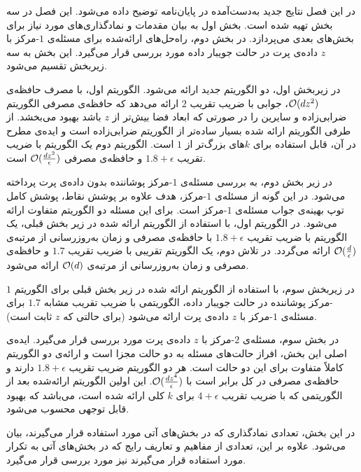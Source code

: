 

در این فصل نتایج جدید به‌دست‌آمده در پایان‌نامه توضیح داده می‌شود.
این فصل در سه بخش تهیه شده است. بخش اول به بیان مقدمات و نمادگذاری‌های مورد نیاز برای بخش‌های بعدی می‌پردازد.
در بخش دوم، راه‌حل‌های ارائه‌شده برای مسئله‌ی $1$-مرکز با $z$ داده‌ی پرت در حالت جویبار داده مورد بررسی قرار می‌گیرد. این بخش به سه زیربخش تقسیم می‌شود. 

در زیربخش اول، دو الگوریتم جدید ارائه می‌شود. الگوریتم اول، با مصرف حافظه‌ی $\mathcal{O}(dz^2)$، جوابی با ضریب تقریب $2$ ارائه می‌دهد که حافظه‌ی مصرفی الگوریتم ضرابی‌زاده و سایرین  را در صورتی که ابعاد فضا بیش‌تر از $z$ باشد بهبود می‌بخشد.
از طرفی الگوریتم ارائه شده بسیار ساده‌تر از الگوریتم ضرابی‌زاده است و ایده‌ی مطرح در آن، قابل استفاده برای $k$های بزرگ‌تر از $1$ است.
الگوریتم دوم یک الگوریتم با ضریب تقریب $1.8 + \epsilon$ و حافظه‌ی مصرفی $\mathcal{O}(\frac{dz^2}{\epsilon})$ است.

در زیر بخش دوم، به بررسی مسئله‌ی $1$-مرکز پوشاننده بدون داده‌ی پرت پرداخته می‌شود.
در این گونه از مسئله‌ی $1$-مرکز، هدف علاوه بر پوشش نقاط، پوشش کامل توپ بهینه‌ی جواب مسئله‌ی $1$-مرکز است.
برای این مسئله دو الگوریتم متفاوت ارائه می‌شود.
در الگوریتم اول، با استفاده از الگوریتم ارائه شده در زیر بخش قبلی، یک الگوریتم با ضریب تقریب $1.8 + \epsilon$ با حافظه‌ی مصرفی و زمان به‌روزرسانی از مرتبه‌ی $\mathcal{O}(\frac{d}{\epsilon})$ ارائه می‌گردد.
در تلاش دوم، یک الگوریتم تقریبی با ضریب تقریب $1.7$ و حافظه‌ی مصرفی و زمان به‌روزرسانی از مرتبه‌ی $\mathcal{O}(d)$ ارائه می‌شود. 

در زیربخش سوم، با استفاده از الگوریتم ارائه شده در زیر بخش قبلی برای الگوریتم $1$-مرکز پوشاننده در حالت جویبار داده، الگوریتمی با ضریب تقریب مشابه $1.7$ برای مسئله‌ی $1$-مرکز با $z$ داده‌ی پرت ارائه می‌شود (برای حالتی که $z$ ثابت است). 

در بخش سوم، مسئله‌ی $2$-مرکز با $z$ داده‌ی پرت مورد بررسی قرار می‌گیرد.
ایده‌ی اصلی این بخش، افراز حالت‌های مسئله به دو حالت مجزا است و ارائه‌ی دو الگوریتم کاملاً متفاوت برای این دو حالت است.
هر دو الگوریتم ضریب تقریب $1.8 + \epsilon$ دارند و حافظه‌ی مصرفی در کل برابر است با 
$\mathcal{O}(\frac{dz^4}{\epsilon})$.
این اولین الگوریتم ارائه‌شده‌ بعد از الگوریتمی که با ضریب تقریب $4+\epsilon$ برای $k$ کلی ارائه شده است، می‌باشد که بهبود قابل توجهی محسوب می‌شود.


در این بخش، تعدادی نمادگذاری که در بخش‌های آتی مورد استفاده قرار می‌گیرند، بیان می‌شود.
علاوه بر این، تعدادی از مفاهیم و تعاریف رایج که در بخش‌های آتی به تکرار مورد استفاده قرار می‌گیرند نیز مورد بررسی قرار می‌گیرد.


